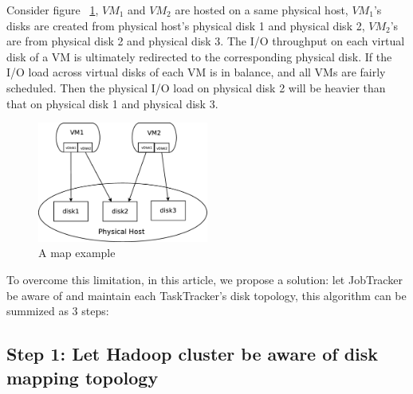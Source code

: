 \documentclass[11pt,a4paper]{article}
\begin{document}
Consider figure ~\ref {fig:map}, $VM_1$ and $VM_2$ are hosted on a same physical 
host, $VM_1$'s disks are created from physical host's physical disk 1 and 
physical disk 2, $VM_2$'s are from physical disk 2 and physical disk 3. 
The I/O throughput on each virtual disk of a VM is ultimately redirected 
to the corresponding physical disk. If the I/O load across virtual disks of 
each VM is in balance, and all VMs are fairly scheduled. 
Then the physical I/O load on physical disk 2 will be heavier than that on 
physical disk 1 and physical disk 3.

\begin{figure}[h]
\centering
\includegraphics[width=0.5\textwidth]{figure/map}
\caption{A map example}
\label{fig:map}
\end{figure}

To overcome this limitation, in this article, we propose a solution: let 
JobTracker be aware of and maintain each TaskTracker's disk topology,  this 
algorithm can be summized as 3 steps:

\subsection{\textbf {Step 1: Let Hadoop cluster be aware of disk mapping topology}}
\end{document}
